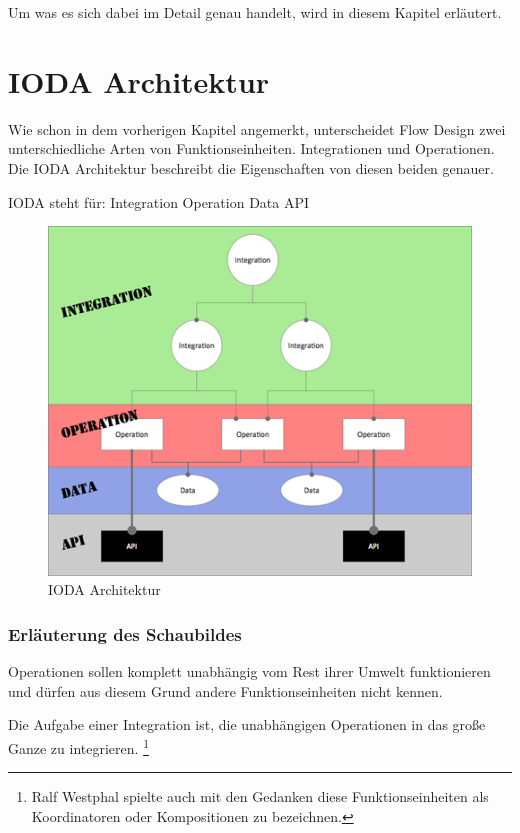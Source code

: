 Um was es sich dabei im Detail genau handelt, wird in diesem Kapitel erläutert.

\pagebreak
\section{IODA Architektur}


Wie schon in dem vorherigen Kapitel angemerkt, unterscheidet Flow Design zwei
unterschiedliche Arten von Funktionseinheiten. Integrationen und Operationen.
Die IODA Architektur beschreibt die Eigenschaften von diesen beiden genauer.

IODA steht für: Integration Operation Data API


\begin{figure}[H]
	\centering
	\includegraphics[width=.9\linewidth]{./img/ioda1.png}
	\caption{IODA Architektur}
\end{figure}



\let\thefootnote\relax{}
\subsubsection{Erläuterung des Schaubildes}

Operationen sollen komplett unabhängig vom Rest ihrer Umwelt funktionieren und
dürfen aus diesem Grund andere Funktionseinheiten nicht kennen.

Die Aufgabe einer Integration ist, die unabhängigen Operationen in das große Ganze zu
integrieren. 
\footnote{Ralf Westphal spielte auch mit den Gedanken diese Funktionseinheiten als Koordinatoren oder
Kompositionen zu bezeichnen.}

